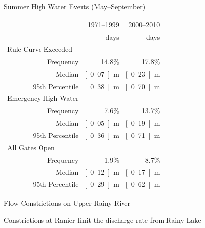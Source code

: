 \documentclass[compress,english]{beamer}
\begin{document}
\begin{frame}{Summer High Water Events (May--September)}
\vfill
\hfill\begin{tabular}{lrrr}\toprule
\qquad\qquad\qquad\quad & & 1971--1999 & 2000--2010	\\
& & \unit[4437]{days} & \unit[1683]{days} \\
\midrule
\multicolumn{2}{l}{Rule Curve Exceeded} & & \\
& Frequency & 14.8\% & 17.8\% \\
& Median & \unit[0.07]{m} & \unit[0.23]{m}\\
& 95th Percentile & \unit[0.38]{m} & \unit[0.70]{m}\\
\midrule
\multicolumn{2}{l}{Emergency High Water} & & \\
& Frequency & 7.6\% & 13.7\%\\
& Median & \unit[0.05]{m} & \unit[0.19]{m} \\
& 95th Percentile & \unit[0.36]{m} & \unit[0.71]{m} \\
\midrule
\multicolumn{2}{l}{All Gates Open} & &\\
& Frequency & 1.9\% & 8.7\% \\
& Median & \unit[0.12]{m} & \unit[0.17]{m}\\
& 95th Percentile & \unit[0.29]{m} & \unit[0.62]{m} \\
\midrule
\end{tabular}\hfill
\vspace*{3mm}
\vfill

\end{frame}
 
\begin{frame}{Flow Constrictions on Upper Rainy River}

Constrictions at Ranier limit the discharge rate from Rainy Lake
\begin{center}
\end{center}

\end{frame}
\end{document}

